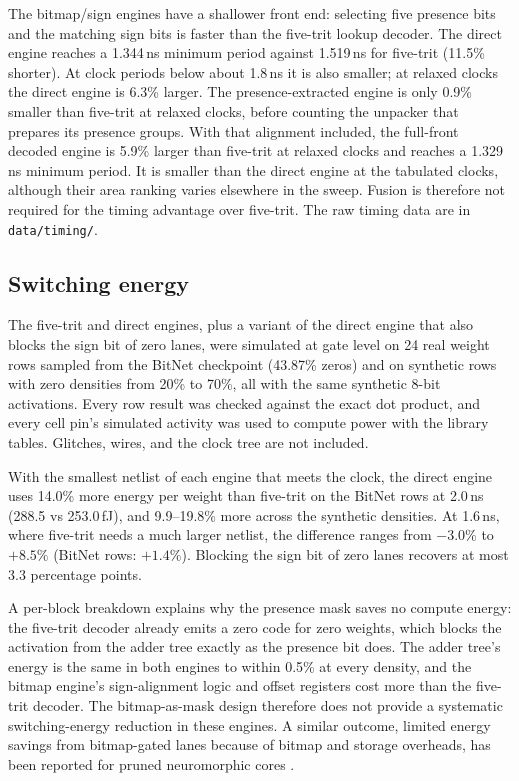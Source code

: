 \documentclass[11pt]{article}
\begin{document}
The bitmap/sign engines have a shallower front end: selecting five presence
bits and the matching sign bits is faster than the five-trit lookup decoder.
The direct engine reaches a 1.344\,ns minimum period against 1.519\,ns for
five-trit (11.5\% shorter). At clock periods below about 1.8\,ns it is also
smaller; at relaxed clocks the direct engine is 6.3\% larger. The
presence-extracted engine is only 0.9\% smaller than five-trit at relaxed
clocks, before counting the unpacker that prepares its presence groups. With that alignment included, the full-front decoded engine is 5.9\% larger than five-trit at relaxed clocks and reaches a 1.329\,ns minimum period. It is smaller than the direct engine at the tabulated clocks, although their area ranking varies elsewhere in the sweep. Fusion is therefore not required for the timing advantage over five-trit. The raw timing data are in \texttt{data/timing/}.

\subsection{Switching energy}

The five-trit and direct engines, plus a variant of the direct engine that
also blocks the sign bit of zero lanes, were simulated at gate level on 24
real weight rows sampled from the BitNet checkpoint (43.87\% zeros) and on
synthetic rows with zero densities from 20\% to 70\%, all with the same
synthetic 8-bit activations. Every row result was checked against the exact
dot product, and every cell pin's simulated activity was used to compute
power with the library tables. Glitches, wires, and the clock tree are not
included.

With the smallest netlist of each engine that meets the clock, the direct
engine uses 14.0\% more energy per weight than five-trit on the BitNet rows
at 2.0\,ns (288.5 vs 253.0\,fJ), and 9.9--19.8\% more across the synthetic
densities. At 1.6\,ns, where five-trit needs a much larger netlist, the
difference ranges from $-3.0\%$ to $+8.5\%$ (BitNet rows: $+1.4\%$). Blocking
the sign bit of zero lanes recovers at most 3.3 percentage points.

A per-block breakdown explains why the presence mask saves no compute
energy: the five-trit decoder already emits a zero code for zero weights,
which blocks the activation from the adder tree exactly as the presence bit
does. The adder tree's energy is the same in both engines to within 0.5\%
at every density, and the bitmap engine's sign-alignment logic and offset
registers cost more than the five-trit decoder. The bitmap-as-mask design
therefore does not provide a systematic switching-energy reduction in these engines. A similar
outcome, limited energy savings from bitmap-gated lanes because of bitmap
and storage overheads, has been reported for pruned neuromorphic cores
\cite{westerink2026sparsitytax}.
\end{document}
